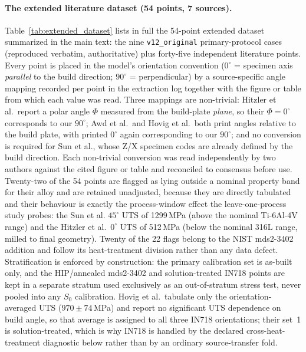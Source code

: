 \documentclass[11pt,a4paper,twocolumn]{article}
\providecommand{\ang}[1]{\ensuremath{#1^{\circ}}}
\begin{document}
\paragraph{The extended literature dataset (54 points, 7 sources).} Table~\ref{tab:extended_dataset} lists in
full the 54-point extended dataset summarized in the main text: the nine \texttt{v12\_original} primary-protocol
cases (reproduced verbatim, authoritative) plus forty-five independent literature points. Every point is placed
in the model's orientation convention ($\ang{0}$ = specimen axis \emph{parallel} to the build direction;
$\ang{90}$ = perpendicular) by a source-specific angle mapping recorded per point in the extraction log together
with the figure or table from which each value was read. Three mappings are non-trivial: Hitzler et al.\ report a
polar angle $\Phi$ measured from the build-plate \emph{plane}, so their $\Phi = 0^\circ$ corresponds to our
$\ang{90}$; Awd et al.\ and Hovig et al.\ both print angles relative to the build plate, with printed $0^\circ$
again corresponding to our $\ang{90}$; and no conversion is required for Sun et al., whose Z/X specimen codes are
already defined by the build direction. Each non-trivial conversion was read independently by two authors against
the cited figure or table and reconciled to consensus before use. Twenty-two of the 54 points are flagged as lying
outside a nominal property band for their alloy and are retained unadjusted, because they are directly tabulated
and their behaviour is exactly the process-window effect the leave-one-process study probes: the Sun et al.
$\ang{45}$ UTS of 1299\,MPa (above the nominal Ti-6Al-4V range) and the Hitzler et al.\ $\ang{0}$ UTS of 512\,MPa
(below the nominal 316L range, milled to final geometry). Twenty of the 22 flags belong to the NIST mds2-3402
addition and follow its heat-treatment division rather than any data defect. Stratification is enforced by
construction: the primary calibration set is as-built only, and the HIP/annealed mds2-3402 and solution-treated
IN718 points are kept in a separate stratum used exclusively as an out-of-stratum stress test, never pooled into
any $S_0$ calibration. Hovig et al.\ tabulate only the orientation-averaged UTS ($970\pm74$\,MPa) and report no
significant UTS dependence on build angle, so that average is assigned to all three IN718 orientations; their
set~1 is solution-treated, which is why IN718 is handled by the declared cross-heat-treatment diagnostic below
rather than by an ordinary source-transfer fold.
\end{document}
